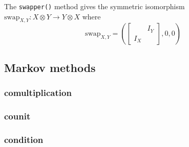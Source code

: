 The \lstinline{swapper()} method gives the symmetric isomorphism $\mathrm{swap}_{X,Y}: X\otimes Y \rightarrow Y\otimes X$ where
\begin{equation}
	\mathrm{swap}_{X,Y} = \left(
	\begin{bmatrix} & I_Y \\ I_X & \end{bmatrix}, 0, 0\right)
\end{equation}
\subsection{Markov methods}
\subsubsection{comultiplication}
\subsubsection{counit}
\subsubsection{condition}
